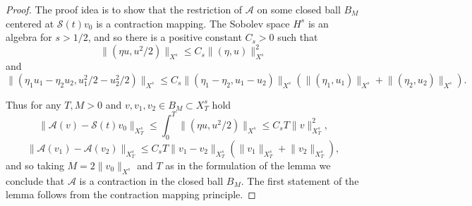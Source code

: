 \documentclass[reqno,12pt,a4paper]{article}
\theoremstyle{plain}
\begin{document}
\begin{proof}
The proof idea is to show that the restriction of $\mathcal A$
on some closed ball $B_M$ centered at $\mathcal S(t)v_0$
is a contraction mapping.
The Sobolev space $H^s$ is an algebra for $s > 1/2$, and so
there is a positive constant $C_s > 0$
such that 
\[
	\lVert ( \eta u, u^2/2 ) \rVert _{X^s}
	\leqslant
	C_s \lVert ( \eta, u ) \rVert _{X^s}^2
\]
and
\[
	\lVert ( \eta_1 u_1 - \eta_2 u_2,
	u_1^2/2 - u_2^2/2 ) \rVert _{X^s}
	\leqslant
	C_s \lVert ( \eta_1 - \eta_2, u_1 - u_2 ) \rVert _{X^s}
	(
		\lVert ( \eta_1, u_1 ) \rVert _{X^s}
		+
		\lVert ( \eta_2, u_2 ) \rVert _{X^s}
	)
	.
\]



Thus for any $T, M > 0$ and $v, v_1, v_2 \in B_M \subset X^s_T$ hold
%
\[
	\lVert \mathcal A(v) - \mathcal S(t)v_0 \rVert _{X^s_T}
	\leqslant
	\int_0^T \lVert ( \eta u, u^2/2 ) \rVert _{X^s}
	\leqslant
	C_sT \lVert v \rVert _{X^s_T}^2
	,
\]
%
\[
	\lVert \mathcal A(v_1) - \mathcal A(v_2) \rVert _{X^s_T}
	\leqslant
	C_sT \lVert v_1 - v_2 \rVert _{X^s_T}
	(
		\lVert v_1 \rVert _{X^s_T}
		+
		\lVert v_2 \rVert _{X^s_T}
	)
	,
\]
and so taking $M = 2\lVert v_0 \rVert _{X^s}$
and $T$ as in the formulation of the lemma
we conclude that $\mathcal A$ is a contraction in
the closed ball $B_M$.
The first statement of the lemma follows from the
contraction mapping principle.



\end{proof}
\end{document}
